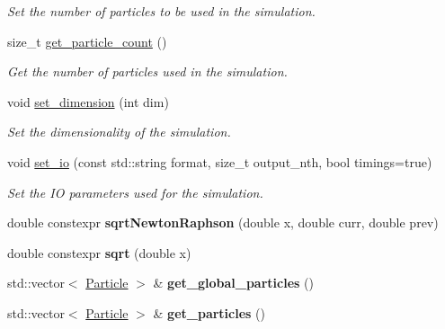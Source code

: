 \begin{DoxyCompactItemize}
\begin{DoxyCompactList}\small\item\em Set the number of particles to be used in the simulation. \end{DoxyCompactList}\item 
size\+\_\+t \mbox{\hyperlink{namespacewash_a3b281fefe2419e7bc1450029b0324ab8}{get\+\_\+particle\+\_\+count}} ()
\begin{DoxyCompactList}\small\item\em Get the number of particles used in the simulation. \end{DoxyCompactList}\item 
void \mbox{\hyperlink{namespacewash_a6b9608d3d8934431c9ab6af488992f10}{set\+\_\+dimension}} (int dim)
\begin{DoxyCompactList}\small\item\em Set the dimensionality of the simulation. \end{DoxyCompactList}\item 
\mbox{\label{namespacewash_aaa75af8f4a35ef4b222eace2714ee9f8}} 
void \mbox{\hyperlink{namespacewash_aaa75af8f4a35ef4b222eace2714ee9f8}{set\+\_\+io}} (const std\+::string format, size\+\_\+t output\+\_\+nth, bool timings=true)
\begin{DoxyCompactList}\small\item\em Set the IO parameters used for the simulation. \end{DoxyCompactList}\item 
\mbox{\label{namespacewash_a344dd90c7f5c2e7fb6ba80fc25d71bf2}} 
double constexpr {\bfseries sqrt\+Newton\+Raphson} (double x, double curr, double prev)
\item 
\mbox{\label{namespacewash_aa7c01695ae3be583edc0ed8c4bd756f5}} 
double constexpr {\bfseries sqrt} (double x)
\item 
\mbox{\label{namespacewash_a95f49b3110d612f44f7b88a0da43f154}} 
std\+::vector$<$ \mbox{\hyperlink{classwash_1_1Particle}{Particle}} $>$ \& {\bfseries get\+\_\+global\+\_\+particles} ()
\item 
\mbox{\label{namespacewash_a79e2901674acaec9da9603ba4fdb12bf}} 
std\+::vector$<$ \mbox{\hyperlink{classwash_1_1Particle}{Particle}} $>$ \& {\bfseries get\+\_\+particles} ()

\end{DoxyCompactItemize}
